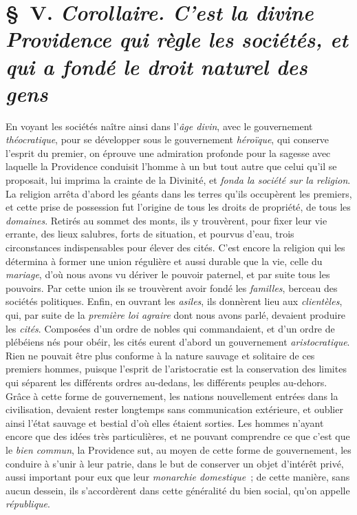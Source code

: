 \documentclass[french,twoside]{book} %
\begin{document}
\section[{§ V. Corollaire. C’est la divine Providence qui règle les sociétés, et qui a fondé le droit naturel des gens}]{§ V. {\itshape Corollaire. C’est la divine Providence qui règle les sociétés, et qui a fondé le droit naturel des gens}}
\noindent En voyant les sociétés naître ainsi dans l’{\itshape âge divin}, avec le gouvernement {\itshape théocratique}, pour se développer sous le gouvernement {\itshape héroïque}, qui conserve l’esprit du premier, on éprouve une admiration profonde pour la sagesse avec laquelle la Providence conduisit l’homme à un but tout autre que celui qu’il se proposait, lui imprima la crainte de la Divinité, et {\itshape fonda la société sur la religion}. La religion arrêta d’abord les géants dans les terres qu’ils occupèrent les premiers, et cette prise de possession fut l’origine de tous les droits de propriété, de tous les {\itshape domaines}. Retirés au sommet des monts, ils y trouvèrent, pour fixer leur vie errante, des  lieux salubres, forts de situation, et pourvus d’eau, trois circonstances indispensables pour élever des cités. C’est encore la religion qui les détermina à former une union régulière et aussi durable que la vie, celle du {\itshape mariage}, d’où nous avons vu dériver le pouvoir paternel, et par suite tous les pouvoirs. Par cette union ils se trouvèrent avoir fondé les {\itshape familles}, berceau des sociétés politiques. Enfin, en ouvrant les {\itshape asiles}, ils donnèrent lieu aux {\itshape clientèles}, qui, par suite de la {\itshape première loi agraire} dont nous avons parlé, devaient produire les {\itshape cités}. Composées d’un ordre de nobles qui commandaient, et d’un ordre de plébéiens nés pour obéir, les cités eurent d’abord un gouvernement {\itshape aristocratique}. Rien ne pouvait être plus conforme à la nature sauvage et solitaire de ces premiers hommes, puisque l’esprit de l’aristocratie est la conservation des limites qui séparent les différents ordres au-dedans, les différents peuples au-dehors. Grâce à cette forme de gouvernement, les nations nouvellement entrées dans la civilisation, devaient rester longtemps sans communication extérieure, et oublier ainsi l’état sauvage et bestial d’où elles étaient sorties. Les hommes n’ayant encore que des idées très particulières, et ne pouvant comprendre ce que c’est que le {\itshape bien commun}, la Providence sut, au moyen de cette forme de gouvernement, les conduire à s’unir à leur patrie, dans le but de conserver un objet d’intérêt privé, aussi important pour eux que leur {\itshape monarchie domestique} ; de cette manière, sans aucun dessein, ils  s’accordèrent dans cette généralité du bien social, qu’on appelle {\itshape république}.\par
\end{document}
